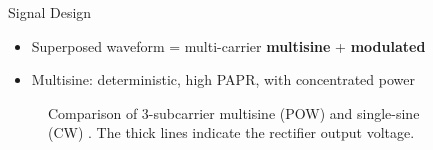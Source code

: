 \documentclass[xcolor={table}]{beamer}
\begin{document}
\begin{frame}[fragile=singleslide,t]
\begin{columns}[onlytextwidth,T]
\begin{column}{.47\textwidth}
\begin{block}{Signal Design}
\begin{itemize}
  \item Superposed waveform = multi-carrier \textbf{multisine} + \textbf{modulated}
  \item Multisine: deterministic, high PAPR, with concentrated power
\end{itemize}
\begin{figure}
  \centering
  \caption{Comparison of 3-subcarrier multisine (POW) and single-sine (CW) \citep{Trotter2009}. The thick lines indicate the rectifier output voltage.}
  \label{fig:waveform_comparison}
\end{figure}
\end{block}

\end{column}


\begin{column}{.47\textwidth}


\end{column}
\end{columns}
\end{frame}
\end{document}
